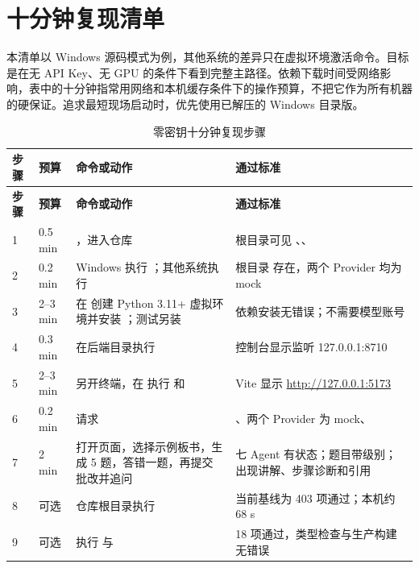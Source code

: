 \clearpage
\appendix
\section{十分钟复现清单}

本清单以 Windows 源码模式为例，其他系统的差异只在虚拟环境激活命令。目标是在无 API Key、无 GPU 的条件下看到完整主路径。依赖下载时间受网络影响，表中的十分钟指常用网络和本机缓存条件下的操作预算，不把它作为所有机器的硬保证。追求最短现场启动时，优先使用已解压的 Windows 目录版。

\begin{longtable}{@{}L{0.8cm}L{1.3cm}L{7.1cm}L{5.5cm}@{}}
\caption{零密钥十分钟复现步骤}\label{tab:reproduce}\\
\toprule
\textbf{步骤} & \textbf{预算} & \textbf{命令或动作} & \textbf{通过标准} \\
\midrule
\endfirsthead
\toprule
\textbf{步骤} & \textbf{预算} & \textbf{命令或动作} & \textbf{通过标准} \\
\midrule
{} & 0.5 min & ，进入仓库 & 根目录可见 、、 \\
2 & 0.2 min & Windows 执行 ；其他系统执行  & 根目录  存在，两个 Provider 均为 mock \\
3 & 2--3 min & 在  创建 Python 3.11+ 虚拟环境并安装 ；测试另装  & 依赖安装无错误；不需要模型账号 \\
4 & 0.3 min & 在后端目录执行  & 控制台显示监听 127.0.0.1:8710 \\
5 & 2--3 min & 另开终端，在  执行  和  & Vite 显示 \url{http://127.0.0.1:5173} \\
6 & 0.2 min & 请求  & 、两个 Provider 为 mock、 \\
7 & 2 min & 打开页面，选择示例板书，生成 5 题，答错一题，再提交批改并追问 & 七 Agent 有状态；题目带级别；出现讲解、步骤诊断和引用 \\
8 & 可选 & 仓库根目录执行  & 当前基线为 403 项通过；本机约 68 s \\
9 & 可选 &  执行  与  & 18 项通过，类型检查与生产构建无错误 \\
\bottomrule
\end{longtable}

